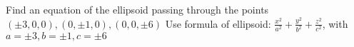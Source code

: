 \documentclass[12pt]{article}
\begin{document}
\begin{paracol}{2}
        \begin{fleqn}
            Find an equation of the ellipsoid passing through the points \newline
            $(\pm3,0,0),(0,\pm1,0),(0,0,\pm6) $ \newline
            Use formula of ellipsoid: $\frac{x^2}{a^2} + \frac{y^2}{b^2} + \frac{z^2}{c^2}$, with $a=\pm3, b=\pm1, c=\pm 6$
        \end{fleqn}

        \newpage

    \end{paracol}
\end{document}
